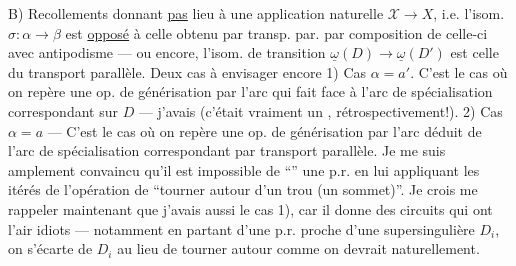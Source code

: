 B) Recollements  donnant \uline{pas} lieu à une application naturelle $\mathcal X\longrightarrow X$, i.e. l'isom. $\sigma:\alpha\longrightarrow\beta$ est \uline{opposé} à celle obtenu par transp. par.  par composition de celle-ci avec antipodisme --- ou encore, l'isom. de transition $\underline\omega(D)\longrightarrow\underline\omega(D')$ est  celle du transport parallèle. Deux cas à envisager encore
1) Cas $\alpha=a'$. C'est le cas où on repère une op. de générisation  par l'arc qui fait face à l'arc de spécialisation correspondant sur $D$ ---   j'avais  (c'était vraiment un , rétrospectivement!).
2) Cas $\alpha=a$ --- C'est le cas où on repère une op. de générisation par l'arc  déduit de l'arc de spécialisation correspondant par transport parallèle. Je me suis amplement convaincu qu'il est impossible de ``'' une p.r. en lui appliquant les itérés de l'opération \unsure{$\rho$|$\varphi$} de ``tourner autour d'un trou (un sommet\unsure{\ldots})''.
Je crois me rappeler maintenant que j'avais  aussi le cas 1), car il donne  des circuits qui ont l'air idiots --- notamment en partant d'une p.r. proche d'une supersingulière $D_i$, on s'écarte de $D_i$ au lieu de tourner autour comme on devrait naturellement.
